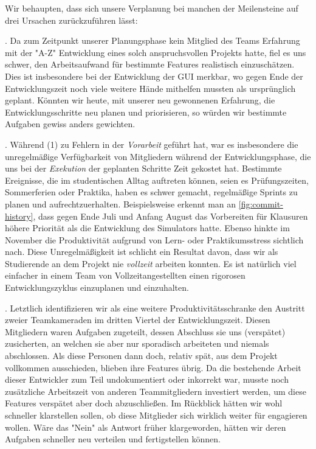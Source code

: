 \pagebreak
Wir behaupten, dass sich unsere Verplanung bei manchen der Meilensteine auf drei Ursachen zurückzuführen lässt:
\begin{senumerate}{-0.3cm}

  . Da zum Zeitpunkt
  unserer Planungsphase kein Mitglied des Teams Erfahrung mit der "A-Z"
  Entwicklung eines solch anspruchsvollen Projekts hatte, fiel es uns schwer,
  den Arbeitsaufwand für bestimmte Features realistisch einzuschätzen. Dies ist
  insbesondere bei der Entwicklung der GUI merkbar, wo gegen Ende der
  Entwicklungszeit noch viele weitere Hände mithelfen mussten als ursprünglich
  geplant. Könnten wir heute, mit unserer neu gewonnenen Erfahrung, die
  Entwicklungsschritte neu planen und priorisieren, so würden wir bestimmte
  Aufgaben gewiss anders gewichten.

  . Während (1) zu Fehlern in der
  \emph{Vorarbeit} geführt hat, war es insbesondere die unregelmäßige
  Verfügbarkeit von Mitgliedern während der Entwicklungsphase, die uns bei der
  \emph{Exekution} der geplanten Schritte Zeit gekostet hat. Bestimmte
  Ereignisse, die im studentischen Alltag auftreten können, seien es
  Prüfungszeiten, Sommerferien oder Praktika, haben es schwer gemacht,
  regelmäßige Sprints zu planen und aufrechtzuerhalten. Beispielsweise erkennt
  man an \autoref{fig:commit-history}, dass gegen Ende Juli und Anfang August
  das Vorbereiten für Klausuren höhere Priorität als die Entwicklung des
  Simulators hatte. Ebenso hinkte im November die Produktivität aufgrund von
  Lern- oder Praktikumsstress sichtlich nach. Diese Unregelmäßigkeit ist
  schlicht ein Resultat davon, dass wir als Studierende an dem Projekt nie
  \emph{vollzeit} arbeiten konnten. Es ist natürlich viel einfacher in einem
  Team von Vollzeitangestellten einen rigorosen Entwicklungszyklus einzuplanen
  und einzuhalten.

  . Letztlich identifizieren wir als eine
  weitere Produktivitätsschranke den Austritt zweier Teamkameraden im dritten
  Viertel der Entwicklungszeit. Diesen Mitgliedern waren Aufgaben zugeteilt,
  dessen Abschluss sie uns (verspätet) zusicherten, an welchen sie aber nur
  sporadisch arbeiteten und niemals abschlossen. Als diese Personen dann doch,
  relativ spät, aus dem Projekt vollkommen ausschieden, blieben ihre Features
  übrig. Da die bestehende Arbeit dieser Entwickler zum Teil undokumentiert oder
  inkorrekt war, musste noch zusätzliche Arbeitszeit von anderen Teammitgliedern
  investiert werden, um diese Features verspätet aber doch abzuschließen. Im
  Rückblick hätten wir wohl schneller klarstellen sollen, ob diese Mitglieder
  sich wirklich weiter für \erasim{} engagieren wollen. Wäre das "Nein" als
  Antwort früher klargeworden, hätten wir deren Aufgaben schneller neu verteilen
  und fertigstellen können.
  \vspace{-0.2cm}
\end{senumerate}
